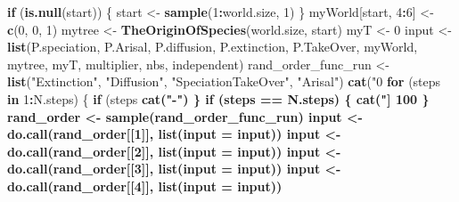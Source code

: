 \documentclass[]{book}
\newenvironment{Shaded}{\begin{snugshade}}{\end{snugshade}}
\newcommand{\KeywordTok}[1]{\textcolor[rgb]{0.13,0.29,0.53}{\textbf{{#1}}}}
\newcommand{\DataTypeTok}[1]{\textcolor[rgb]{0.13,0.29,0.53}{{#1}}}
\newcommand{\DecValTok}[1]{\textcolor[rgb]{0.00,0.00,0.81}{{#1}}}
\newcommand{\CharTok}[1]{\textcolor[rgb]{0.31,0.60,0.02}{{#1}}}
\newcommand{\StringTok}[1]{\textcolor[rgb]{0.31,0.60,0.02}{{#1}}}
\newcommand{\ControlFlowTok}[1]{\textcolor[rgb]{0.13,0.29,0.53}{\textbf{{#1}}}}
\newcommand{\OperatorTok}[1]{\textcolor[rgb]{0.81,0.36,0.00}{\textbf{{#1}}}}
\newcommand{\NormalTok}[1]{{#1}}
\theoremstyle{definition}
\theoremstyle{definition}
\theoremstyle{remark}
\begin{document}
\begin{Shaded}
\begin{Highlighting}[]
    \ControlFlowTok{if}\NormalTok{ (}\KeywordTok{is.null}\NormalTok{(start)) \{}
\NormalTok{        start <-}\StringTok{ }\KeywordTok{sample}\NormalTok{(}\DecValTok{1}\OperatorTok{:}\NormalTok{world.size, }\DecValTok{1}\NormalTok{)}
\NormalTok{    \}}
\NormalTok{    myWorld[start, }\DecValTok{4}\OperatorTok{:}\DecValTok{6}\NormalTok{] <-}\StringTok{ }\KeywordTok{c}\NormalTok{(}\DecValTok{0}\NormalTok{, }\DecValTok{0}\NormalTok{, }\DecValTok{1}\NormalTok{)}
\NormalTok{    mytree <-}\StringTok{ }\KeywordTok{TheOriginOfSpecies}\NormalTok{(world.size, start)}
\NormalTok{    myT <-}\StringTok{ }\DecValTok{0}
\NormalTok{    input <-}\StringTok{ }\KeywordTok{list}\NormalTok{(P.speciation, P.Arisal, P.diffusion, P.extinction, }
\NormalTok{        P.TakeOver, myWorld, mytree, myT, multiplier, nbs, independent)}
\NormalTok{    rand_order_func_run <-}\StringTok{ }\KeywordTok{list}\NormalTok{(}\StringTok{"Extinction"}\NormalTok{, }\StringTok{"Diffusion"}\NormalTok{, }\StringTok{"SpeciationTakeOver"}\NormalTok{, }
        \StringTok{"Arisal"}\NormalTok{)}
    \KeywordTok{cat}\NormalTok{(}\StringTok{"0%
    \ControlFlowTok{for}\NormalTok{ (steps }\ControlFlowTok{in} \DecValTok{1}\OperatorTok{:}\NormalTok{N.steps) \{}
        \ControlFlowTok{if}\NormalTok{ (steps}\OperatorTok{%
            \KeywordTok{cat}\NormalTok{(}\StringTok{"-"}\NormalTok{)}
\NormalTok{        \}}
        \ControlFlowTok{if}\NormalTok{ (steps }\OperatorTok{==}\StringTok{ }\NormalTok{N.steps) \{}
            \KeywordTok{cat}\NormalTok{(}\StringTok{"] 100 %
\NormalTok{        \}}
\NormalTok{        rand_order <-}\StringTok{ }\KeywordTok{sample}\NormalTok{(rand_order_func_run)}
\NormalTok{        input <-}\StringTok{ }\KeywordTok{do.call}\NormalTok{(rand_order[[}\DecValTok{1}\NormalTok{]], }\KeywordTok{list}\NormalTok{(}\DataTypeTok{input =}\NormalTok{ input))}
\NormalTok{        input <-}\StringTok{ }\KeywordTok{do.call}\NormalTok{(rand_order[[}\DecValTok{2}\NormalTok{]], }\KeywordTok{list}\NormalTok{(}\DataTypeTok{input =}\NormalTok{ input))}
\NormalTok{        input <-}\StringTok{ }\KeywordTok{do.call}\NormalTok{(rand_order[[}\DecValTok{3}\NormalTok{]], }\KeywordTok{list}\NormalTok{(}\DataTypeTok{input =}\NormalTok{ input))}
\NormalTok{        input <-}\StringTok{ }\KeywordTok{do.call}\NormalTok{(rand_order[[}\DecValTok{4}\NormalTok{]], }\KeywordTok{list}\NormalTok{(}\DataTypeTok{input =}\NormalTok{ input))}
}}}
\end{Highlighting}
\end{Shaded}
\end{document}
